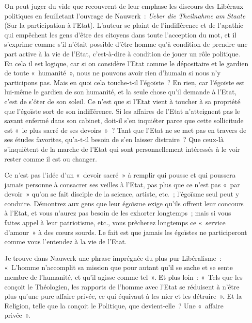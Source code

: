 \documentclass[french,twoside]{book} %
\begin{document}
On peut juger du vide que recouvrent de leur emphase les discours des Libéraux politiques en feuilletant l’ouvrage de Nauwerk : \emph{Ueber die Theilnahme am Staate} (Sur la participation à l’Etat). L’auteur se plaint de l’indifférence et de l’apathie qui empêchent  les gens d’être des citoyens dans toute l’acception du mot, et il s’exprime comme s’il n’était possible d’être homme qu’à condition de prendre une part active à la vie de l’Etat, c’est-à-dire à condition de jouer un rôle politique. En cela il est logique, car si on considère l’Etat comme le dépositaire et le gardien de toute « humanité », nous ne pouvons avoir rien d’humain si nous n’y participons pas. Mais en quoi cela touche-t-il l’égoïste ? En rien, car l’égoïste est lui-même le gardien de son humanité, et la seule chose qu’il demande à l’Etat, c’est de s’ôter de son soleil. Ce n’est que si l’Etat vient à toucher à sa propriété que l’égoïste sort de son indifférence. Si les affaires de l’Etat n’atteignent pas le savant enfermé dans son cabinet, doit-il s’en inquiéter parce que cette sollicitude est « le plus sacré de ses devoirs » ? Tant que l’Etat ne se met pas en travers de ses études favorites, qu’a-t-il besoin de s’en laisser distraire ? Que ceux-là s’inquiètent de la marche de l’Etat qui sont personnellement intéressés à le voir rester comme il est ou changer.\par
Ce n’est pas l’idée d’un « devoir sacré » à remplir qui pousse et qui poussera jamais personne à consacrer ses veilles à l’Etat, pas plus que ce n’est pas « par devoir » qu’on se fait disciple de la science, artiste, etc. ; l’égoïsme seul peut y conduire. Démontrez aux gens que leur égoïsme exige qu’ils offrent leur concours à l’Etat, et vous n’aurez pas besoin de les exhorter longtemps ; mais si vous faites appel à leur patriotisme, etc., vous prêcherez longtemps ce « service d’amour » à des cœurs sourds. Le fait est que jamais les égoïstes ne participeront comme vous l’entendez à la vie de l’Etat.\par
Je trouve dans Nauwerk une phrase imprégnée du plus pur Libéralisme : « L’homme n’accomplit sa mission que pour autant qu’il se sache et se sente membre de l’humanité, et qu’il agisse comme tel ». Et plus loin : « Tels que les conçoit le Théologien, les  rapports de l’homme avec l’Etat se réduisent à n’être plus qu’une pure affaire privée, ce qui équivaut à les nier et les détruire ». Et la Religion, telle que la conçoit le Politique, que devient-elle ? Une « affaire privée ».\par
\end{document}
